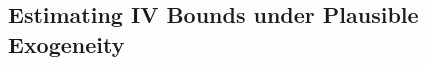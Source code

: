 \documentclass[subeqn]{article}
\begin{document}
\begin{spacing}{1.4}

\subsection{Estimating IV Bounds under Plausible Exogeneity}
\label{TWINscn:gamma}


\end{spacing}
\end{document}
